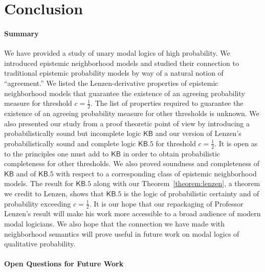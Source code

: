 \documentclass[12pt]{article}
\theoremstyle{definition}
\newcommand{\KB}{{\mathsf{KB}}}                 %
\newcommand{\KBeq}{{\mathsf{KB.5}}}             %
\begin{document}
\section{Conclusion} 
\label{SectionFRW}

\paragraph{Summary}

We have provided a study of unary modal logics of high probability.
We introduced epistemic neighborhood models and studied their
connection to traditional epistemic probability models by way of a
natural notion of ``agreement.''  We listed the Lenzen-derivative
properties of epistemic neighborhood models that guarantee the
existence of an agreeing probability measure for threshold
$c=\frac 12$.  The list of properties required to guarantee the
existence of an agreeing probability measure for other thresholds is
unknown.  We also presented our study from a proof theoretic point of
view by introducing a probabilistically sound but incomplete logic
$\KB$ and our version of Lenzen's probabilistically sound and complete
logic $\KBeq$ for threshold $c=\frac 12$.  It is open as to the
principles one must add to $\KB$ in order to obtain probabilistic
completeness for other thresholds.  We also proved soundness and
completeness of $\KB$ and of $\KBeq$ with respect to a corresponding
class of epistemic neighborhood models.  The result for $\KBeq$ along
with our Theorem~\ref{theorem:lenzen}, a theorem we credit to Lenzen,
shows that $\KBeq$ is the logic of probabilistic certainty and of
probability exceeding $c=\frac 12$.  It is our hope that our
repackaging of Professor Lenzen's result will make his work more
accessible to a broad audience of modern modal logicians.  We also
hope that the connection we have made with neighborhood semantics will
prove useful in future work on modal logics of qualitative
probability.

\paragraph{Open Questions for Future Work}
\end{document}

